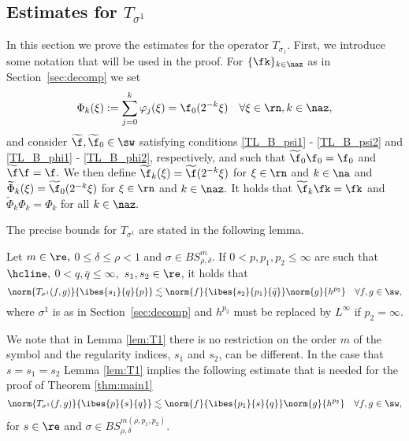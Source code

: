 \subsection{Estimates for $T_{\sigma^1}$}\label{sec:T1}
In this section we prove the estimates for the operator $T_{\sigma_1}$. First, we introduce some notation that will be used in the proof. 
For $\{\fk\}_{k\in\naz}$ as in Section~\ref{sec:decomp} we set
\begin{equation*}
\Phi_k(\xi):= \sum_{j=0}^k \varphi_j(\xi)=\f_0(2^{-k}\xi)\quad \forall \xi\in\rn, k\in\naz,
\end{equation*}
and consider $\widetilde{\f},\widetilde{\f}_0\in\sw$ satisfying conditions \ref{TL_B_psi1} - \ref{TL_B_psi2} and \ref{TL_B_phi1}  - \ref{TL_B_phi2}, respectively, and such that $\widetilde{\f}_0\f_0=\f_0$ and $\widetilde{\f}\f=\f.$ We then define $\widetilde{\f}_k(\xi)=\widetilde{\f}(2^{-k}\xi)$ for $\xi\in\rn$ and $k\in\na$ and $\widetilde{\Phi}_k(\xi)=\widetilde{\f}_0(2^{-k}\xi)$ for $\xi\in\rn$ and $k\in\naz.$ It holds that $\widetilde{\f}_k \fk = \fk$ and $\widetilde{\Phi}_k \Phi_k = \Phi_k$ for all $k\in\naz.$

The precise bounds for $T_{\sigma^1}$ are stated in the following lemma.

\begin{lemma}\label{lem:T1} Let $m \in \re,$  $0 \le \delta\le  \rho < 1$ and $\sigma \in BS^m_{\rho, \delta}$. If   $0<p,p_1,p_2\le \infty$ are such that $\hcline,$ $0 < q ,\bar{q}\leq \infty,$ $s_1, s_2 \in \re$, it holds that
\begin{equation}\label{eq:estT1}
\norm{T_{\sigma^1}(f,g)}{\ibes{s_1}{q}{p}}  \lesssim \norm{f}{\ibes{s_2}{p_1}{\bar{q}}} \norm{g}{h^{p_2}} \quad \forall f, g \in \sw,
\end{equation}
where $\sigma^1$ is as in Section~\ref{sec:decomp} and $h^{p_2}$ must be replaced by $L^\infty$ if $p_2=\infty.$
\end{lemma}


We note that in Lemma \ref{lem:T1} there is no restriction on the order $m$ of the symbol and the regularity indices, $s_1$ and $s_2$, can be different. In the case that $s=s_1=s_2$ Lemma \ref{lem:T1} implies the following estimate that is needed for the proof of Theorem \ref{thm:main1} 
$$\norm{T_{\sigma^1}(f,g)}{\ibes{p}{s}{q}}  \lesssim \norm{f}{\ibes{p_1}{s}{q}} \norm{g}{h^{p_2}} \quad \forall f, g \in \sw,$$
for $s\in\re$ and $\sigma\in BS^{m(\rho,p_1,p_2)}_{\rho,\delta}$.



